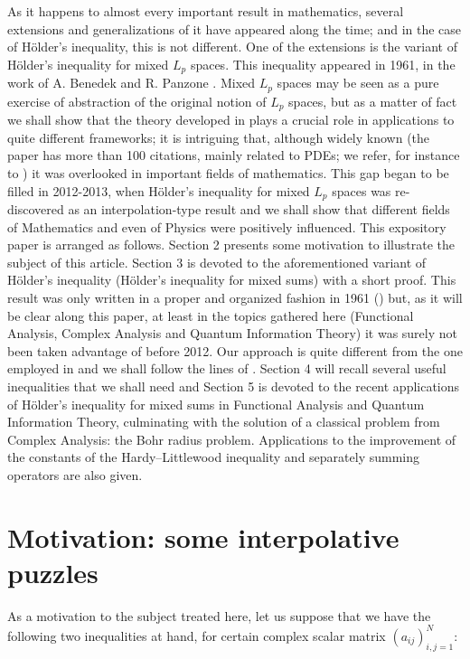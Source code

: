 \documentclass[10pt]{amsart}
\numberwithin{equation}{section}
\begin{document}
As it happens to almost every important result in mathematics, several
extensions and generalizations of it have appeared along the time; and in
the case of H{\"{o}}lder's inequality, this is not different. One of the
extensions is the variant of H{\"{o}}lder's inequality for mixed $L_{p}$
spaces. This inequality appeared in 1961, in the work of A. Benedek and R.
Panzone \cite{bene}. Mixed $L_{p}$ spaces may be seen as a pure exercise of
abstraction of the original notion of $L_{p}$ spaces, but as a matter of
fact we shall show that the theory developed in \cite{bene} plays a crucial
role in applications to quite different frameworks; it is intriguing that,
although widely known (the paper \cite{bene} has more than 100 citations,
mainly related to PDEs; we refer, for instance to \cite{veve, fff}) it was
overlooked in important fields of mathematics. This gap began to be filled
in 2012-2013, when H{\"{o}}lder's inequality for mixed $L_{p}$ spaces was
re-discovered as an interpolation-type result and we shall show that
different fields of Mathematics and even of Physics were positively
influenced. This expository paper is arranged as follows. Section 2 presents
some motivation to illustrate the subject of this article. Section 3 is
devoted to the aforementioned variant of H\"{o}lder's inequality (H\"{o}lder's inequality for mixed sums) with a short proof. This result was only
written in a proper and organized fashion in 1961 (\cite{bene}) but, as it
will be clear along this paper, at least in the topics gathered here
(Functional Analysis, Complex Analysis and Quantum Information Theory) it
was surely not been taken advantage of before 2012. Our approach is quite
different from the one employed in \cite{bene} and we shall follow the lines
of \cite{bps}. Section 4 will recall several useful inequalities that we
shall need and Section 5 is devoted to the recent applications of H\"{o}lder's inequality for mixed sums in Functional Analysis and Quantum
Information Theory, culminating with the solution of a classical problem
from Complex Analysis: the Bohr radius problem. Applications to the
improvement of the constants of the Hardy--Littlewood inequality and
separately summing operators are also given.

\section{Motivation: some interpolative puzzles}

\label{puzz}

As a motivation to the subject treated here, let us suppose that we have the
following two inequalities at hand, for certain complex scalar matrix $(a_{ij})_{i, j=1}^{N}$:
\end{document}
